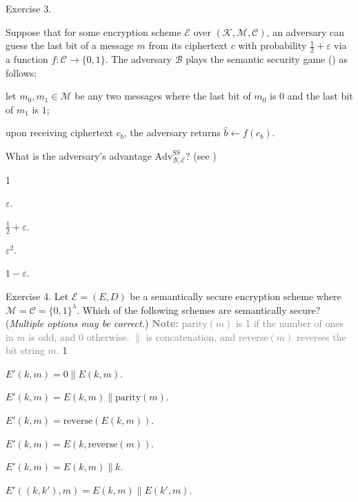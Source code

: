 \documentclass[../../book.tex]{subfiles}
\begin{document}
\begin{xexercise}
    {Exercise 3.}
    {Suppose that for some encryption scheme $\mathcal{E}$ over $(\mathcal{K},\mathcal{M},\mathcal{C})$, an adversary can guess the last bit of a message $m$ from its ciphertext $c$ with probability $\frac{1}{2}+\varepsilon$ via a function $f: \mathcal{C} \to \{0,1\}$. The adversary $\mathcal{B}$ plays the semantic security game () as follows: 
    \begin{algoen}
        \item let $m_0,m_1 \in \mathcal{M}$ be any two messages where the last bit of $m_0$ is $0$ and the last bit of $m_1$ is $1$;
        \item upon receiving ciphertext $c_b$, the adversary returns $\widehat{b} \gets f(c_b)$.
    \end{algoen}
    What is the adversary's advantage $\text{Adv}^{\text{SS}}_{\mathcal{B},\mathcal{E}}$? (see )}
    {1}
    {
        \item $\varepsilon$.
        \item $\frac{1}{2}+\varepsilon$.
        \item $\varepsilon^2$.
        \item $1-\varepsilon$.
    }
\end{xexercise}

\begin{xexercise}
    {Exercise 4.}
    {Let $\mathcal{E} = (E,D)$ be a semantically secure encryption scheme where $\mathcal{M}=\mathcal{C}=\{0,1\}^{\lambda}$. Which of the following schemes are semantically secure? (\textit{Multiple options may be correct.})
    \newline
    \textcolor{gray}{\textbf{Note:} $\text{parity}(m)$ is 1 if the number of ones in $m$ is odd, and 0 otherwise. $\parallel$ is concatenation, and $\text{reverse}(m)$ reverses the bit string $m$.}}
    {1}
    {
        \item $E'(k,m) = 0 \parallel E(k,m)$.
        \item $E'(k,m)=E(k,m) \parallel \text{parity}(m)$.
        \item $E'(k,m)=\text{reverse}(E(k,m))$.
        \item $E'(k,m)=E(k,\text{reverse}(m))$.
        \item $E'(k,m) = E(k,m) \parallel k$.
        \item $E'((k,k'),m) = E(k,m) \parallel E(k',m)$.
    }
\end{xexercise}
\end{document}
